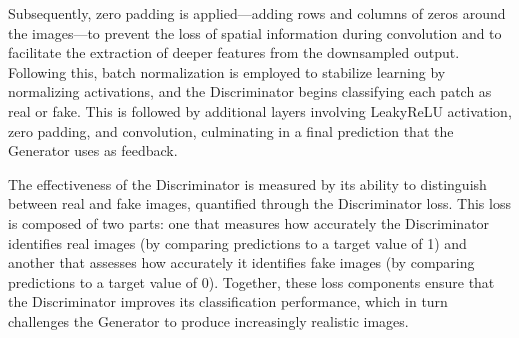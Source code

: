Subsequently, zero padding is applied—adding rows and columns of zeros around the images—to prevent the loss of spatial information during convolution and to facilitate the extraction of deeper features from the downsampled output. Following this, batch normalization is employed to stabilize learning by normalizing activations, and the Discriminator begins classifying each patch as real or fake. This is followed by additional layers involving LeakyReLU activation, zero padding, and convolution, culminating in a final prediction that the Generator uses as feedback.

The effectiveness of the Discriminator is measured by its ability to distinguish between real and fake images, quantified through the Discriminator loss. This loss is composed of two parts: one that measures how accurately the Discriminator identifies real images (by comparing predictions to a target value of 1) and another that assesses how accurately it identifies fake images (by comparing predictions to a target value of 0). Together, these loss components ensure that the Discriminator improves its classification performance, which in turn challenges the Generator to produce increasingly realistic images.
